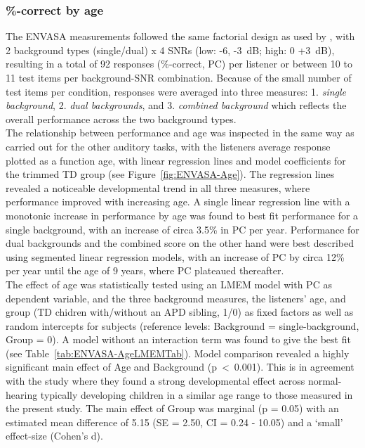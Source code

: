 \documentclass[a4paper, twoside]{templates/ociamthesis}
\begin{document}
\hypertarget{correct-by-age}{%
\subsubsection*{\%-correct by age}\label{correct-by-age}}

The ENVASA measurements followed the same factorial design as used by \textcite{Leech2009}, with 2 background types (single/dual) x 4 SNRs (low: -6, -3~dB; high: 0 +3~dB), resulting in a total of 92 responses (\%-correct, PC) per listener or between 10 to 11 test items per background-SNR combination. Because of the small number of test items per condition, responses were averaged into three measures: 1. \emph{single background}, 2. \emph{dual backgrounds}, and 3. \emph{combined background} which reflects the overall performance across the two background types.\\

The relationship between performance and age was inspected in the same way as carried out for the other auditory tasks, with the listeners average response plotted as a function age, with linear regression lines and model coefficients for the trimmed TD group (see Figure~\ref{fig:ENVASA-Age}). The regression lines revealed a noticeable developmental trend in all three measures, where performance improved with increasing age. A single linear regression line with a monotonic increase in performance by age was found to best fit performance for a single background, with an increase of circa 3.5\% in PC per year. Performance for dual backgrounds and the combined score on the other hand were best described using segmented linear regression models, with an increase of PC by circa 12\% per year until the age of 9 years, where PC plateaued thereafter.\\

The effect of age was statistically tested using an LMEM model with PC as dependent variable, and the three background measures, the listeners' age, and group (TD chidren with/without an APD sibling, 1/0) as fixed factors as well as random intercepts for subjects (reference levels: Background = single-background, Group = 0). A model without an interaction term was found to give the best fit (see Table~\ref{tab:ENVASA-AgeLMEMTab}). Model comparison revealed a highly significant main effect of Age and Background (p~\textless~0.001). This is in agreement with the \textcite{Krishnan2013} study where they found a strong developmental effect across normal-hearing typically developing children in a similar age range to those measured in the present study. The main effect of Group was marginal (p = 0.05) with an estimated mean difference of 5.15 (SE = 2.50, CI = 0.24 - 10.05) and a `small' effect-size (Cohen's d).\\
\end{document}
